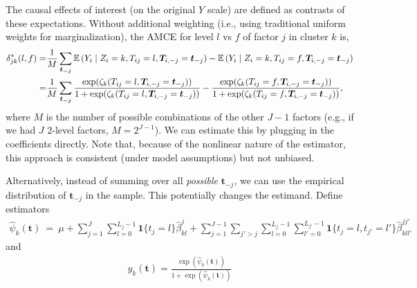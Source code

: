  The causal effects of interest (on the original $Y$ scale) are
 defined as contrasts of these expectations.  Without additional
 weighting (i.e., using traditional uniform weights for
 marginalization), the AMCE for level $l$ vs $f$ of factor $j$ in
 cluster $k$ is,
\begin{align*}
\delta^*_{jk}(l,f)=
&\frac{1}{M}\sum_{\bm{t_{-j}}}\mathbb{E}\left(Y_i \mid  Z_i=k, {T}_{ij}=l,
                      \bm{T}_{i,-j} = \bm{t}_{-j}\right) -
                      \mathbb{E}\left(Y_i\mid Z_i=k, {T}_{ij}=f, \bm{T}_{i,-j} =
                      \bm{t}_{-j}\right) \\ 
= &\frac{1}{M}\sum_{\bm{t_{-j}}} \frac{\exp( \zeta_{k}(T_{ij} = l, \bm{T}_{i,-j} = \bm{t}_{-j}))}{1+\exp(\zeta_{k}(T_{ij} = l, \bm{T}_{i,-j} = \bm{t}_{-j}))} -\frac{\exp( \zeta_{k}(T_{ij} = f, \bm{T}_{i,-j} = \bm{t}_{-j}))}{1+\exp(\zeta_{k}(T_{ij} = f, \bm{T}_{i,-j} = \bm{t}_{-j}))},
\end{align*}
where $M$ is the number of possible combinations of the other $J-1$ factors (e.g., if we had $J$ 2-level factors, $M=2^{J-1}$).
We can estimate this by plugging in the coefficients directly.
Note that, because of the nonlinear nature of the estimator, this approach is consistent (under model assumptions) but not unbiased.
 
Alternatively, instead of summing over all \textit{possible}
$\bm{t}_{-j}$, we can use the empirical distribution of $\bm{t}_{-j}$
in the sample.  This potentially changes the estimand.
Define estimators
  \begin{align*}
 \widehat{\psi}_{k}(\bm{t}) \ =\ \mu + \sum_{j=1}^J \sum_{l =0}^{L_j-1} 
\mathbf{1}\{t_{j} = l\} \widehat{\beta}^j_{kl} + \sum_{j=1}^{J-1} \sum_{j' >
  j} \sum_{l=0}^{L_j-1} \sum_{l' = 0}^{L_{j'}-1} \mathbf{1}\{t_{j} = l,
t_{j'} = l'\} \widehat{\beta}^{jj'}_{kll'}
 \end{align*}
 and 
\begin{align*}
\widehat{y}_k(\bm{t}) = \frac{\exp(   \widehat{\psi}_{k}(\bm{t}) )}{1+\exp(  \widehat{\psi}_{k}(\bm{t}) )}
\end{align*}
 
